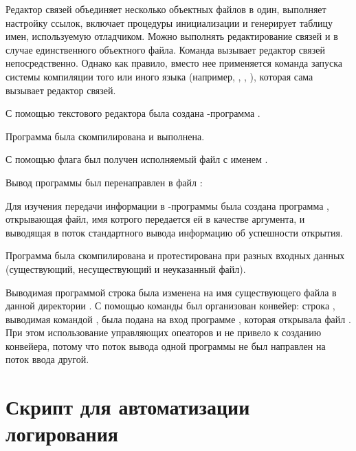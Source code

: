 Редактор связей объединяет несколько объектных файлов в один, выполняет настройку ссылок, включает процедуры инициализации и генерирует таблицу имен, используемую отладчиком. Можно выполнять редактирование связей и в случае единственного объектного файла. Команда  вызывает редактор связей непосредственно. Однако как правило, вместо нее применяется команда запуска системы компиляции того или иного языка (например, , , ), которая сама вызывает редактор связей.

С помощью текстового редактора  была создана -программа .


Программа была скомпилирована и выполнена.


С помощью флага  был получен исполняемый файл с именем .


\newpage

Вывод программы был перенаправлен в файл :


Для изучения передачи информации в -программы была создана программа , открывающая файл, имя котрого передается ей в качестве аргумента, и выводящая в поток стандартного вывода информацию об успешности открытия.


Программа была скомпилирована и протестирована при разных входных данных (существующий, несуществующий и неуказанный файл).


Выводимая программой  строка была изменена на имя существующего файла в данной директории . С помощью команды  был организован конвейер: строка , выводимая командой , была подана на вход программе , которая открывала файл . При этом использование управляющих опеаторов \code{||} и \code{\&\&} не привело к созданию конвейера, потому что поток вывода одной программы не был направлен на поток ввода другой.

\newpage
 


\section{Скрипт для автоматизации логирования}

